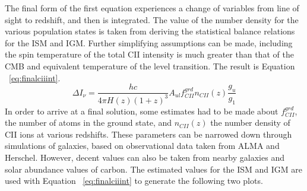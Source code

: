 \documentclass[manuscript]{aastex}
\begin{document}
The final form of the first equation experiences a change of variables from line of sight to redshift, and then is integrated. The value of the number density for the various population states is taken from deriving the statistical balance relations for the ISM and IGM. 
Further simplifying assumptions can be made, including the spin temperature of the total CII intensity is much greater than that of the CMB and equivalent temperature of the level transition. The result is Equation ~\ref{eq:finalciiint}.
\begin{equation}\label{eq:finalciiint}
\Delta I_{\nu} = \frac{h c}{4 \pi H(z) (1+z)^{3}} A_{ul} f_{CII}^{grd} n_{CII}(z) \frac{g_{u}}{g_{1}} 
\end{equation}
In order to arrive at a final solution, some estimates had to be made about  $f_{CII}^{grd}$, the number of atoms in the ground state, and $n_{CII}(z)$ the number density of CII ions at various redshifts. 
These parameters can be narrowed down through simulations of galaxies, based on observational data taken from ALMA and Herschel. However, decent values can also be taken from nearby galaxies and solar abundance values of carbon. The estimated values for the ISM and IGM are used with Equation ~\ref{eq:finalciiint} to generate the following two plots.
\end{document}
